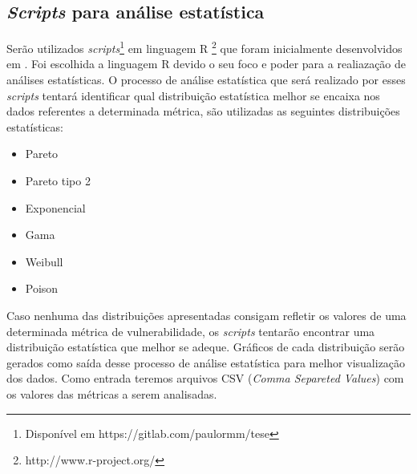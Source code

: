 \subsection{\textit{Scripts} para análise estatística}

Serão utilizados \textit{scripts}\footnote{Disponível em https://gitlab.com/paulormm/tese} em linguagem R
\footnote{http://www.r-project.org/} que foram inicialmente desenvolvidos em \cite{meirelles2013}. Foi escolhida a linguagem R
devido o seu foco e poder para a realiazação de análises estatísticas. O processo de análise estatística que será realizado
por esses \textit{scripts} tentará identificar qual distribuição estatística melhor se encaixa nos dados referentes a 
determinada métrica, são utilizadas as seguintes distribuições estatísticas:

\begin{itemize}
  \item Pareto
  \item Pareto tipo 2
  \item Exponencial
  \item Gama
  \item Weibull
  \item Poison
\end{itemize}

Caso nenhuma das distribuições apresentadas consigam refletir os valores de uma determinada métrica de vulnerabilidade, os
\textit{scripts} tentarão encontrar uma distribuição estatística que melhor se adeque. Gráficos de cada distribuição serão
gerados como saída desse processo de análise estatística para melhor visualização dos dados. Como entrada teremos arquivos
CSV (\textit{Comma Separeted Values}) com os valores das métricas a serem analisadas.


